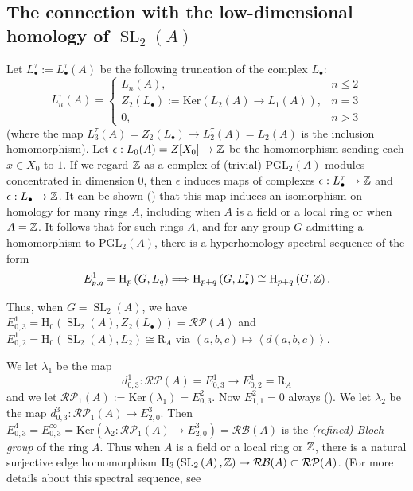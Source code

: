 \documentclass[12pt]{amsart}
\theoremstyle{definition}
\newcommand{\Z}{\Bbb{Z}}
\newcommand{\LL}{L^{\tau}}
\newcommand{\spl}[2]{\operatorname{SL}_{#1}\left(#2\right)}
\newcommand{\pgl}[2]{\mathrm{PGL}_{#1}(#2)}
\newcommand{\rpb}[1]{\mathcal{RP}(#1)}%
\newcommand{\rpbker}[1]{\mathcal{RP}_1(#1)}%
\newcommand{\rbl}[1]{{\mathcal{RB}}(#1)}%
\newcommand{\<}{\langle}
\renewcommand{\>}{\rangle}
\renewcommand{\ker}[1]{\mathrm{Ker}(#1)}
\newcommand{\sgr}[1]{\mathrm{R}_{#1}}%
\newcommand{\an}[1]{\left\langle{#1}\right\rangle}
\newcommand{\ho}[3]{\mathrm{H}_{#1}\left( #2,#3 \right)}
\begin{document}
\subsection{The connection with the low-dimensional homology of $\spl{2}{A}$}
Let $\LL_\bullet:=\LL_\bullet(A)$ be the following truncation of the complex $L_\bullet$:
\[
\LL_n(A)=\left\{
\begin{array}{ll}
L_n(A),& n\leq 2\\
Z_2(L_\bullet):=\ker{L_2(A)\to L_1(A)},& n=3\\
0,& n>3
\end{array}
\right.
\]
(where the map $\LL_3(A)=Z_2(L_\bullet)\to \LL_2(A)=L_2(A)$ is the inclusion homomorphism).
 Let $\epsilon:L_0(A)=Z[X_0]\to \Z$ be the homomorphism sending each $x\in  X_0$ to $1$. If we regard $\Z$ as a complex of (trivial) $\pgl{2}{A}$-modules concentrated in dimension $0$, then $\epsilon$ induces maps of complexes $\epsilon:\LL_\bullet \to \Z$ and $\epsilon:L_\bullet\to \Z$. It can be shown (\cite{hut:ge2}) that this map induces an isomorphism on homology for many rings $A$,
including when $A$ is a field or a local ring or when $A=\Z$. It follows that for such rings $A$, and for any group $G$ admitting a homomorphism to $\pgl{2}{A}$, there is a hyperhomology spectral sequence of the form 
\[
E^1_{p,q}=\ho{p}{G}{L_q}\Longrightarrow \ho{p+q}{G}{\LL_\bullet}\cong\ho{p+q}{G}{\Z}.
\]

Thus, when $G=\spl{2}{A}$, we have $E^1_{0,3}=\ho{0}{\spl{2}{A}}{Z_2(L_\bullet)}=\rpb{A}$ and $E^1_{0,2}=\ho{0}{\spl{2}{A}}{L_2}\cong\sgr{A}$ via $(a,b,c)\mapsto \an{d(a,b,c)}$.

 We let $\lambda_1$ be the map 
\[
d^1_{0,3}:\rpb{A}=E^1_{0,3}\to E^1_{0,2}=\sgr{A}
\]
and we let $\rpbker{A}:=\ker{\lambda_1}=E^2_{0,3}$. Now $E^2_{1,1}=0$ always (\cite[Corollary 4.4]{hut:bloch1}). We let $\lambda_2$ be the map $d^3_{0,3}:\rpbker{A}\to E^3_{2,0}$. Then $E^4_{0,3}=E^\infty_{0,3}=\ker{\lambda_2:\rpbker{A}\to E^3_{2,0}}=\rbl{A}$ is the \emph{(refined) Bloch group} of the ring $A$. Thus when $A$ is a field or a local ring or $\Z$, there is a natural surjective edge homomorphism $\ho{3}{\spl{2}{A}}{\Z}\to \rbl{A}\subset\rpb{A}$. (For more details about this spectral sequence, see \cite[Sections 4,5]{hut:bloch1}
\end{document}
